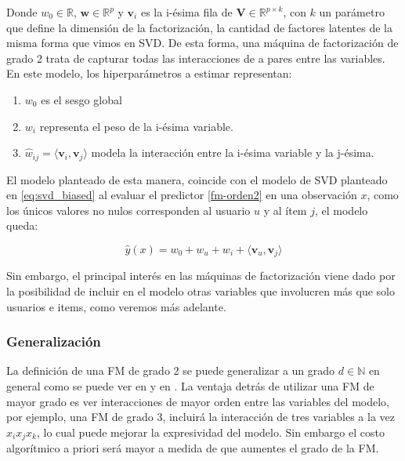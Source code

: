 \documentclass[hidelinks,12pt,a4paper]{book}
\providecommand{\prodint}[1]{\langle#1\rangle}
\theoremstyle{plain}
\theoremstyle{definition}
\begin{document}
Donde $w_0\in \mathbb{R}$, $\mathbf{w}\in \mathbb{R}^p$ y $\mathbf{v}_i$ es la i-ésima fila de $\mathbf{V}\in \mathbb{R}^{p\times k}$, con $k$ un parámetro que define la dimensión de la factorización, la cantidad de factores latentes de la misma forma que vimos en SVD. De esta forma, una máquina de factorización de grado 2 trata de capturar todas las interacciones de a pares entre las variables. En este modelo, los hiperparámetros a estimar representan:

\renewcommand{\labelenumi}{\roman{enumi}}
\begin{enumerate}
\item $w_0$ es el sesgo global
\item $w_i$ representa el peso de la i-ésima variable.
\item $\hat{w}_{ij}=\prodint{\mathbf{v}_i,\mathbf{v}_j}$ modela la interacción entre la i-ésima variable y la j-ésima.
\end{enumerate}

El modelo planteado de esta manera, coincide con el modelo de SVD planteado en \eqref{eq:svd_biased} al evaluar el predictor \eqref{fm-orden2} en una observación $x$, como los únicos valores no nulos corresponden al usuario $u$ y al ítem $j$, el modelo queda:

\begin{equation}
\label{eq:fm-svd}
\hat{y}(x)=w_0+ w_u + w_i + \prodint{\mathbf{v}_u,\mathbf{v}_j}
\end{equation}

Sin embargo, el principal interés en las máquinas de factorización viene dado por la posibilidad de incluir en el modelo otras variables que involucren más que solo usuarios e items, como veremos más adelante.

\subsubsection{Generalización}

La definición de una FM de grado 2 se puede generalizar a un grado $d\in\mathbb{N}$ en general como se puede ver en \cite{rendle2010factorization} y en \cite{FM:blondel2016hofm}. La ventaja detrás de utilizar una FM de mayor grado es ver interacciones de mayor orden entre las variables del modelo, por ejemplo, una FM de grado 3, incluirá la interacción de tres variables a la vez $x_i x_j x_k$, lo cual puede mejorar la expresividad del modelo. Sin embargo el costo algorítmico a priori será mayor a medida de que aumentes el grado de la FM.
\end{document}
